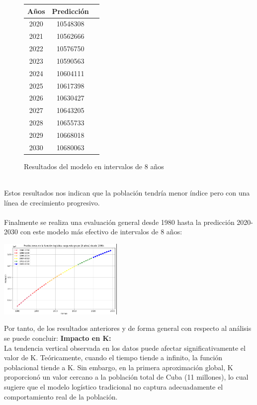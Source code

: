 \documentclass[a4paper,10pt,twocolumn]{article}
\begin{document}
\begin{figure}[h!]%
	\begin{center}
		\begin{tabular}{|c|c|c|} \hline
		Años	& Predicción		\\ \hline
		2020 	& 10548308		    \\ \hline
		2021 	& 10562666		    \\ \hline
		2022 	& 10576750		    \\ \hline
		2023 	& 10590563		    \\ \hline
		2024 	& 10604111		    \\ \hline
		2025 	& 10617398		    \\ \hline
		2026 	& 10630427		    \\ \hline
		2027 	& 10643205		    \\ \hline
		2028 	& 10655733		    \\ \hline
		2029 	& 10668018		    \\ \hline
		2030 	& 10680063		    \\ \hline
		\end{tabular}
	\caption{Resultados del modelo en intervalos de 8 años\label{fig:ex}}
\end{center}
\end{figure}
\\
Estos resultados nos indican que la población tendría menor índice pero con una línea de crecimiento progresivo.\\\\
Finalmente se realiza una evaluación general desde 1980 hasta la predicción 2020-2030 con este modelo más efectivo de intervalos de 8 años:
\begin{center}
	\includegraphics[width=0.45\textwidth]{img/prediccion.png}
\end{center} 
Por tanto, de los resultados anteriores y de forma general con respecto al análisis se puede concluir:
\textbf{Impacto en K: }\\
La tendencia vertical observada en los datos puede afectar significativamente el valor de K. Teóricamente, cuando el tiempo tiende a infinito, la función poblacional tiende a K. Sin embargo, en la primera aproximación global, K proporcionó un valor cercano a la población total de Cuba (11 millones), lo cual sugiere que el modelo logístico tradicional no captura adecuadamente el comportamiento real de la población.\\
\end{document}
